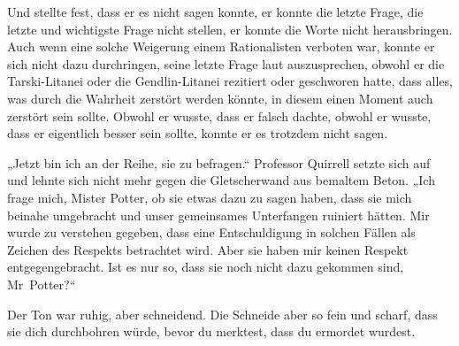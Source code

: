 Und stellte fest, dass er es nicht sagen konnte, er konnte die letzte Frage, die letzte und wichtigste Frage nicht stellen, er konnte die Worte nicht herausbringen. Auch wenn eine solche Weigerung einem Rationalisten verboten war, konnte er sich nicht dazu durchringen, seine letzte Frage laut auszusprechen, obwohl er die Tarski-Litanei oder die Gendlin-Litanei rezitiert oder geschworen hatte, dass alles, was durch die Wahrheit zerstört werden könnte, in diesem einen Moment auch zerstört sein sollte. Obwohl er wusste, dass er falsch dachte, obwohl er wusste, dass er eigentlich besser sein sollte, konnte er es trotzdem nicht sagen.

„Jetzt bin ich an der Reihe, sie zu befragen.“ Professor Quirrell setzte sich auf und lehnte sich nicht mehr gegen die Gletscherwand aus bemaltem Beton.
„Ich frage mich, Mister Potter, ob sie etwas dazu zu sagen haben, dass sie mich beinahe umgebracht und unser gemeinsames Unterfangen ruiniert hätten. Mir wurde zu verstehen gegeben, dass eine Entschuldigung in solchen Fällen als Zeichen des Respekts betrachtet wird. Aber sie haben mir keinen Respekt entgegengebracht. Ist es nur so, dass sie noch nicht dazu gekommen sind, Mr~Potter?“

Der Ton war ruhig, aber schneidend. Die Schneide aber so fein und scharf, dass sie dich durchbohren würde, bevor du merktest, dass du ermordet wurdest.


